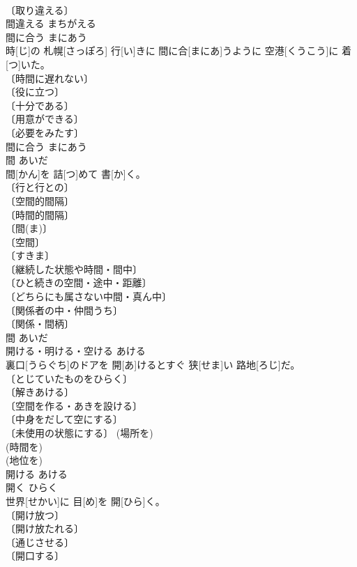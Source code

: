 \documentclass[8pt]{extreport}
\begin{document}
\begin{CJK}{UTF8}{min}
\\	〔取り違える〕 
\\	間違える	まちがえる	
\\	間に合う	まにあう	
\\	時[じ]の 札幌[さっぽろ] 行[い]きに 間に合[まにあ]うように 空港[くうこう]に 着[つ]いた。	
\\	〔時間に遅れない〕 
\\	〔役に立つ〕 
\\	〔十分である〕 
\\	〔用意ができる〕 
\\	〔必要をみたす〕 
\\	間に合う	まにあう	
\\	間	あいだ	
\\	間[かん]を 詰[つ]めて 書[か]く。	
\\	〔行と行との〕 
\\	〔空間的間隔〕 
\\	〔時間的間隔〕 
\\	〔間(ま)〕 
\\	〔空間〕 
\\	〔すきま〕 
\\	〔継続した状態や時間・間中〕 
\\	〔ひと続きの空間・途中・距離〕 
\\	〔どちらにも属さない中間・真ん中〕 
\\	〔関係者の中・仲間うち〕 
\\	〔関係・間柄〕 
\\	間	あいだ	
\\	開ける・明ける・空ける	あける	
\\	裏口[うらぐち]のドアを 開[あ]けるとすぐ 狭[せま]い 路地[ろじ]だ。	
\\	〔とじていたものをひらく〕 
\\	〔解きあける〕 
\\	〔空間を作る・あきを設ける〕 
\\	〔中身をだして空にする〕 
\\	〔未使用の状態にする〕 (場所を) 
\\	(時間を) 
\\	(地位を) 
\\	開ける	あける	
\\	開く	ひらく	
\\	世界[せかい]に 目[め]を 開[ひら]く。	
\\	〔開け放つ〕 
\\	〔開け放たれる〕 
\\	〔通じさせる〕 
\\	〔開口する〕 

\end{CJK}
\end{document}
